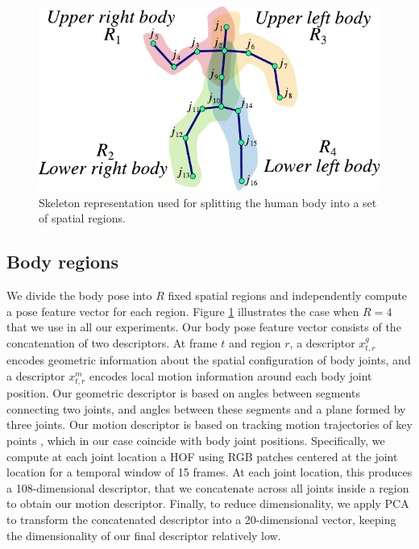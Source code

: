 \begin{figure}[tb]
\begin{center}
\includegraphics[width=0.8\linewidth]{./Fig/fig_joints_limbs_region.pdf}
\vspace{-2mm}
\end{center}
\caption{
\footnotesize
Skeleton representation used for splitting the human body into a set of 
spatial regions.}
\label{fig:skeleton_limbs_regions}
\vspace{-4mm}
\end{figure}

\subsection{Body regions}
We divide the body pose into $R$ fixed spatial regions and independently compute 
a pose feature vector for each region. Figure \ref{fig:skeleton_limbs_regions} 
illustrates the case when $R = 4$ that we use in all our experiments. Our body 
pose feature vector consists of the concatenation of two descriptors. At frame 
$t$ and region $r$, a descriptor $x^{g}_{t,r}$ encodes geometric information 
about the spatial configuration of body joints, and a descriptor $x^{m}_{t,r}$ 
encodes local motion information around each body joint position.
Our geometric descriptor is based on angles between segments 
connecting two joints, and angles between these segments and a plane formed by 
three joints.
Our motion descriptor is based on tracking motion trajectories of key points
\cite{WangCVPR2011}, which in our case coincide with body joint positions.
Specifically, we compute at each joint location a HOF 
using RGB patches centered at the joint location for a temporal window of 15 
frames. At each joint location, this produces a 108-dimensional descriptor,  
that we concatenate across all joints inside a region to obtain our motion descriptor. Finally, 
to reduce dimensionality, we apply PCA to transform the concatenated descriptor 
into a 20-dimensional vector, keeping the dimensionality of our final descriptor 
relatively low.


